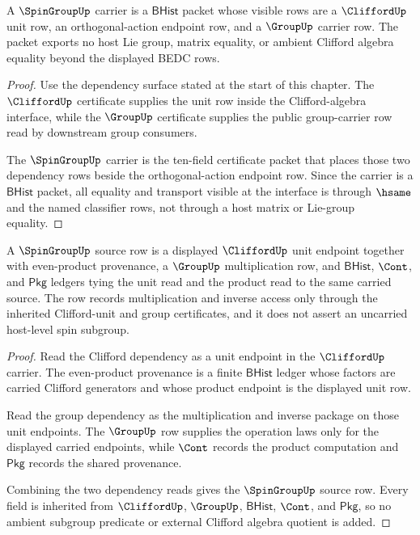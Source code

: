 \begin{theorem}
\label{thm:spingroup-clifford-unit-carrier-obligation}
A $\SpinGroupUp$ carrier is a $\mathsf{BHist}$ packet whose visible rows are a
$\CliffordUp$ unit row, an orthogonal-action endpoint row, and a $\GroupUp$
carrier row. The packet exports no host Lie group, matrix equality, or ambient
Clifford algebra equality beyond the displayed BEDC rows.
\end{theorem}
\begin{proof}
Use the dependency surface stated at the start of this chapter. The
$\CliffordUp$ certificate supplies the unit row inside the Clifford-algebra
interface, while the $\GroupUp$ certificate supplies the public group-carrier
row read by downstream group consumers.

The $\SpinGroupUp$ carrier is the ten-field certificate packet that places
those two dependency rows beside the orthogonal-action endpoint row. Since the
carrier is a $\mathsf{BHist}$ packet, all equality and transport visible at the
interface is through $\hsame$ and the named classifier rows, not through a host
matrix or Lie-group equality.
\end{proof}



\begin{theorem}
\label{thm:spingroup-clifford-unit-source-obligation}
A $\SpinGroupUp$ source row is a displayed $\CliffordUp$ unit endpoint together
with even-product provenance, a $\GroupUp$ multiplication row, and
$\mathsf{BHist}$, $\Cont$, and $\mathsf{Pkg}$ ledgers tying the unit read and
the product read to the same carried source. The row records multiplication
and inverse access only through the inherited Clifford-unit and group
certificates, and it does not assert an uncarried host-level spin subgroup.
\end{theorem}
\begin{proof}
Read the Clifford dependency as a unit endpoint in the $\CliffordUp$ carrier.
The even-product provenance is a finite $\mathsf{BHist}$ ledger whose factors
are carried Clifford generators and whose product endpoint is the displayed
unit row.

Read the group dependency as the multiplication and inverse package on those
unit endpoints. The $\GroupUp$ row supplies the operation laws only for the
displayed carried endpoints, while $\Cont$ records the product computation and
$\mathsf{Pkg}$ records the shared provenance.

Combining the two dependency reads gives the $\SpinGroupUp$ source row. Every
field is inherited from $\CliffordUp$, $\GroupUp$, $\mathsf{BHist}$, $\Cont$,
and $\mathsf{Pkg}$, so no ambient subgroup predicate or external Clifford
algebra quotient is added.
\end{proof}

